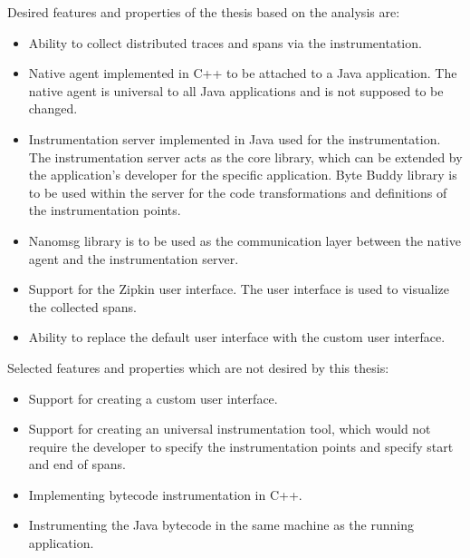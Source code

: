 Desired features and properties of the thesis based on the analysis are:
\begin{itemize}
	\item Ability to collect distributed traces and spans via the instrumentation.
	\item Native agent implemented in C++ to be attached to a Java application. The native agent is universal to all Java applications and is not supposed to be changed.
	\item Instrumentation server implemented in Java used for the instrumentation. The instrumentation server acts as the core library, which can be extended by the application's developer for the specific application. Byte Buddy library is to be used within the server for the code transformations and definitions of the instrumentation points.
	\item Nanomsg library is to be used as the communication layer between the native agent and the instrumentation server.
	\item Support for the Zipkin user interface. The user interface is used to visualize the collected spans.
	\item Ability to replace the default user interface with the custom user interface.
\end{itemize}

Selected features and properties which are not desired by this thesis:
\begin{itemize}
	\item Support for creating a custom user interface. 
	\item Support for creating an universal instrumentation tool, which would not require the developer to specify the instrumentation points and specify start and end of spans.
	\item Implementing bytecode instrumentation in C++.
	\item Instrumenting the Java bytecode in the same machine as the running application.
\end{itemize}

